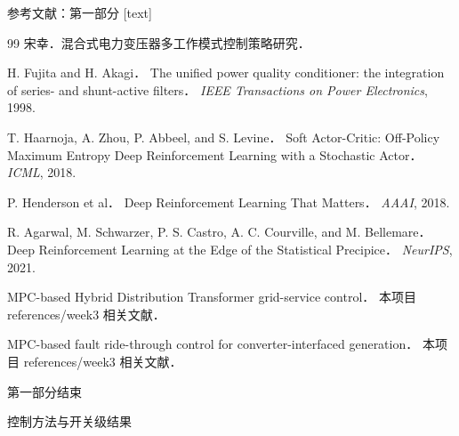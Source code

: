 \documentclass[10pt,aspectratio=169,mathserif]{beamer}
\begin{document}
\begin{frame}[allowframebreaks]{参考文献：第一部分}
\footnotesize
{}[text]
\begin{thebibliography}{99}
宋幸．\newblock 混合式电力变压器多工作模式控制策略研究．

H. Fujita and H. Akagi．
\newblock The unified power quality conditioner: the integration of series- and shunt-active filters．
\newblock \emph{IEEE Transactions on Power Electronics}, 1998.

T. Haarnoja, A. Zhou, P. Abbeel, and S. Levine．
\newblock Soft Actor-Critic: Off-Policy Maximum Entropy Deep Reinforcement Learning with a Stochastic Actor．
\newblock \emph{ICML}, 2018.

P. Henderson et al．
\newblock Deep Reinforcement Learning That Matters．
\newblock \emph{AAAI}, 2018.

R. Agarwal, M. Schwarzer, P. S. Castro, A. C. Courville, and M. Bellemare．
\newblock Deep Reinforcement Learning at the Edge of the Statistical Precipice．
\newblock \emph{NeurIPS}, 2021.

MPC-based Hybrid Distribution Transformer grid-service control．
\newblock 本项目 references/week3 相关文献．

MPC-based fault ride-through control for converter-interfaced generation．
\newblock 本项目 references/week3 相关文献．
\end{thebibliography}
\end{frame}

\begin{frame}
\centering
\vspace{1cm}
\Huge 第一部分结束

\vspace{0.7cm}
\normalsize 控制方法与开关级结果
\end{frame}
\end{document}
